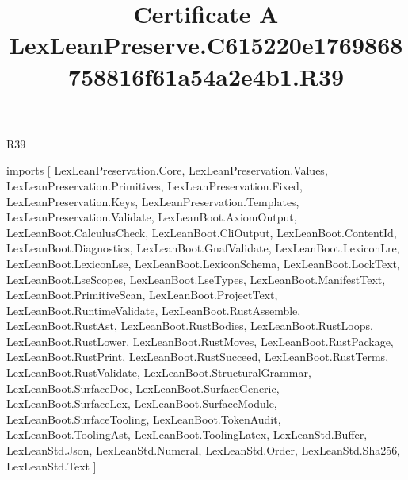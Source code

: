\begin{lexlean}{R39}
\title{Certificate A LexLeanPreserve.C615220e1769868758816f61a54a2e4b1.R39}
\begin{coremodule}
imports [
  LexLeanPreservation.Core,
  LexLeanPreservation.Values,
  LexLeanPreservation.Primitives,
  LexLeanPreservation.Fixed,
  LexLeanPreservation.Keys,
  LexLeanPreservation.Templates,
  LexLeanPreservation.Validate,
  LexLeanBoot.AxiomOutput,
  LexLeanBoot.CalculusCheck,
  LexLeanBoot.CliOutput,
  LexLeanBoot.ContentId,
  LexLeanBoot.Diagnostics,
  LexLeanBoot.GnafValidate,
  LexLeanBoot.LexiconLre,
  LexLeanBoot.LexiconLse,
  LexLeanBoot.LexiconSchema,
  LexLeanBoot.LockText,
  LexLeanBoot.LseScopes,
  LexLeanBoot.LseTypes,
  LexLeanBoot.ManifestText,
  LexLeanBoot.PrimitiveScan,
  LexLeanBoot.ProjectText,
  LexLeanBoot.RuntimeValidate,
  LexLeanBoot.RustAssemble,
  LexLeanBoot.RustAst,
  LexLeanBoot.RustBodies,
  LexLeanBoot.RustLoops,
  LexLeanBoot.RustLower,
  LexLeanBoot.RustMoves,
  LexLeanBoot.RustPackage,
  LexLeanBoot.RustPrint,
  LexLeanBoot.RustSucceed,
  LexLeanBoot.RustTerms,
  LexLeanBoot.RustValidate,
  LexLeanBoot.StructuralGrammar,
  LexLeanBoot.SurfaceDoc,
  LexLeanBoot.SurfaceGeneric,
  LexLeanBoot.SurfaceLex,
  LexLeanBoot.SurfaceModule,
  LexLeanBoot.SurfaceTooling,
  LexLeanBoot.TokenAudit,
  LexLeanBoot.ToolingAst,
  LexLeanBoot.ToolingLatex,
  LexLeanStd.Buffer,
  LexLeanStd.Json,
  LexLeanStd.Numeral,
  LexLeanStd.Order,
  LexLeanStd.Sha256,
  LexLeanStd.Text
]


\end{coremodule}
\end{lexlean}
